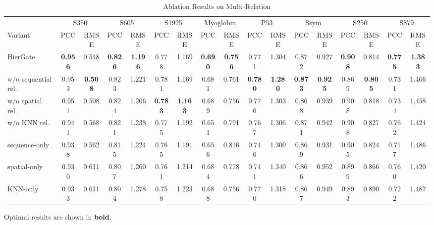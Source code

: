 \documentclass[journal,twoside,web]{ieeecolor}
\begin{document}
\begin{table}[!t]
\footnotesize
\setlength{\tabcolsep}{3pt}
\caption{Ablation Results on Multi-Relation}
\label{tab:ablation_rel}
\begin{tabular*}{\textwidth}{@{\extracolsep{\fill}}lcccccccccccccccc}
\toprule
& \multicolumn{2}{c}{S350} & \multicolumn{2}{c}{S605} & \multicolumn{2}{c}{S1925} & \multicolumn{2}{c}{Myoglobin}
& \multicolumn{2}{c}{P53} & \multicolumn{2}{c}{Ssym} & \multicolumn{2}{c}{S250} & \multicolumn{2}{c}{S879} \\
\cmidrule(lr){2-3} \cmidrule(lr){4-5} \cmidrule(lr){6-7} \cmidrule(lr){8-9}
\cmidrule(lr){10-11} \cmidrule(lr){12-13} \cmidrule(lr){14-15} \cmidrule(lr){16-17}
Variant & PCC & RMSE & PCC & RMSE & PCC & RMSE & PCC & RMSE
        & PCC & RMSE & PCC & RMSE & PCC & RMSE & PCC & RMSE \\
\midrule
HierGate              & \textbf{0.956} & 0.548 & \textbf{0.826} & \textbf{1.196} & 0.778 & 1.169 & \textbf{0.690} & \textbf{0.756}
                      & 0.771 & 1.304 & 0.872 & 0.927 & \textbf{0.908} & 0.814 & \textbf{0.775} & \textbf{1.383} \\
w/o sequential rel.   & 0.953 & \textbf{0.508} & 0.823 & 1.221 & 0.781 & 1.169 & 0.681 & 0.761
                      & \textbf{0.780} & \textbf{1.280} & \textbf{0.873} & \textbf{0.925} & 0.869 & \textbf{0.805} & 0.731 & 1.466 \\
w/o spatial rel.      & 0.951 & 0.508 & 0.824 & 1.206 & \textbf{0.783} & \textbf{1.163} & 0.689 & 0.756
                      & 0.770 & 1.303 & 0.868 & 0.939 & 0.908 & 0.818 & 0.734 & 1.458 \\
w/o KNN rel.          & 0.941 & 0.568 & 0.821 & 1.238 & 0.775 & 1.192 & 0.651 & 0.791
                      & 0.767 & 1.306 & 0.871 & 0.942 & 0.908 & 0.827 & 0.762 & 1.424 \\
sequence-only         & 0.938 & 0.562 & 0.815 & 1.224 & 0.765 & 1.191 & 0.656 & 0.816
                      & 0.746 & 1.300 & 0.869 & 0.931 & 0.905 & 0.824 & 0.717 & 1.486 \\
spatial-only          & 0.930 & 0.611 & 0.807 & 1.260 & 0.761 & 1.214 & 0.684 & 0.778
                      & 0.741 & 1.340 & 0.866 & 0.952 & 0.899 & 0.866 & 0.760 & 1.420 \\
KNN-only              & 0.933 & 0.611 & 0.804 & 1.278 & 0.758 & 1.223 & 0.688 & 0.756
                      & 0.770 & 1.318 & 0.867 & 0.949 & 0.893 & 0.890 & 0.722 & 1.487 \\
\bottomrule
\end{tabular*}
\smallskip

\raggedright\footnotesize Optimal results are shown in \textbf{bold}.
\end{table}
\end{document}
